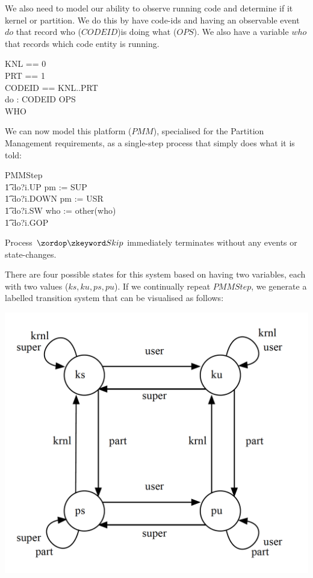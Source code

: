 We also need to model our ability to observe running code
and determine if it kernel or partition.
We do this by have code-ids and having an observable event $do$
that record who ($CODEID$)is doing what ($OPS$).
We also have a variable $who$ that records which code entity is running.
\begin{circus}
KNL == 0 \\
PRT == 1 \\
CODEID == KNL..PRT \\
\circchannel do : CODEID \times OPS \\
WHO 
\end{circus}

We can now model this platform ($PMM$),
specialised for the  Partition Management requirements,
as a single-step process that simply does what it is told:
\begin{circus}
PMMStep  \\
\t1 do?i.UP \then pm := SUP \\
\t1 \extchoice do?i.DOWN \then pm := USR \\
\t1 \extchoice do?i.SW \then who := other(who) \\
\t1 do?i.GOP \then \Skip
\end{circus}
Process $\Skip$ immediately terminates without any events or state-changes.

There are four possible states for this system based on having two variables,
each with two values ($ks, ku, ps, pu$).
If we continually repeat $PMMStep$,
we generate a labelled transition system that can be visualised as follows:

\includegraphics[scale=0.35]{images/CodeModelLTS}


